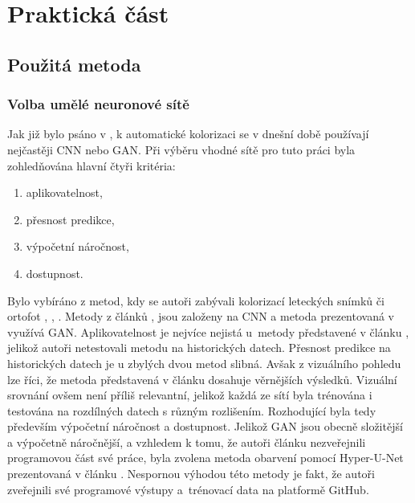 \chapter{Praktická část} \label{chap:practical_part}







\section{Použitá metoda}
\subsection{Volba umělé neuronové sítě}
\label{sec:volbametody}
Jak již bylo psáno v , k automatické kolorizaci se v dnešní době používají nejčastěji CNN nebo GAN. Při výběru vhodné sítě pro tuto práci byla zohledňována hlavní čtyři kritéria:
\begin{enumerate}
  \item aplikovatelnost,
  \item přesnost predikce,
  \item výpočetní náročnost,
  \item dostupnost.
\end{enumerate}

Bylo vybíráno z metod, kdy se autoři zabývali kolorizací leteckých snímků či ortofot \cite{poterek}, \cite{farella}, \cite{dias2020}. Metody z článků \cite{farella}, \cite{dias2020} jsou založeny na CNN a metoda prezentovaná v \cite{poterek} využívá GAN. Aplikovatelnost je nejvíce nejistá u~metody představené v článku \cite{dias2020}, jelikož autoři netestovali metodu na historických datech. Přesnost predikce na historických datech je u zbylých dvou metod slibná. Avšak z vizuálního pohledu lze říci, že metoda představená v článku \cite{poterek} dosahuje věrnějších výsledků. Vizuální srovnání ovšem není příliš relevantní, jelikož každá ze sítí byla trénována i testována na rozdílných datech s různým rozlišením. Rozhodující byla tedy především výpočetní náročnost a dostupnost. Jelikož GAN jsou obecně složitější a výpočetně náročnější, a vzhledem k tomu, že autoři článku \cite{poterek} nezveřejnili programovou část své práce, byla zvolena metoda obarvení pomocí Hyper-U-Net prezentovaná v článku \cite{farella}. Nespornou výhodou této metody je fakt, že autoři zveřejnili své programové výstupy a~trénovací data na platformě GitHub.

